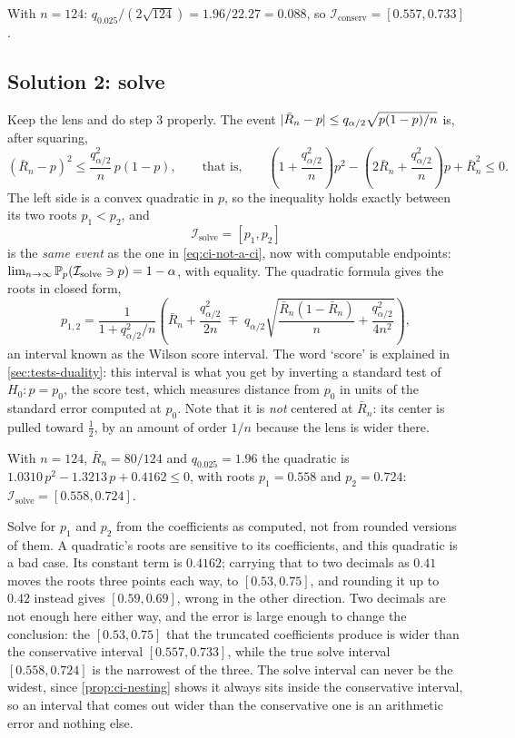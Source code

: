 With $n = 124$: $q_{0.025}/(2\sqrt{124}) = 1.96/22.27 = 0.088$, so $\mathcal{I}_{\text{conserv}} = [0.557, 0.733]$.

\subsection*{Solution 2: solve}

Keep the lens and do step 3 properly.
The event $\lvert\bar{R}_n - p\rvert \leq q_{\alpha/2}\sqrt{p(1-p)/n}$ is, after squaring,
\[
(\bar{R}_n - p)^2 \leq \frac{q_{\alpha/2}^2}{n} \, p(1-p),
\qquad \text{that is,} \qquad
\left( 1 + \frac{q_{\alpha/2}^2}{n} \right) p^2 - \left( 2\bar{R}_n + \frac{q_{\alpha/2}^2}{n} \right) p + \bar{R}_n^2 \leq 0.
\]
The left side is a convex quadratic in $p$, so the inequality holds exactly between its two roots $p_1 < p_2$, and
\[
\mathcal{I}_{\text{solve}} = [p_1, p_2]
\]
is the \textit{same event} as the one in \cref{eq:ci-not-a-ci}, now with computable endpoints: $\lim_{n \to \infty} \mathbb{P}_p(\mathcal{I}_{\text{solve}} \ni p) = 1 - \alpha$, with equality.
The quadratic formula gives the roots in closed form,
\begin{equation}
\label{eq:wilson}
p_{1,2} = \frac{1}{1 + q_{\alpha/2}^2/n} \left( \bar{R}_n + \frac{q_{\alpha/2}^2}{2n} \; \mp \; q_{\alpha/2} \sqrt{ \frac{\bar{R}_n(1 - \bar{R}_n)}{n} + \frac{q_{\alpha/2}^2}{4n^2} } \right),
\end{equation}
an interval known as the Wilson score interval.
The word `score' is explained in \cref{sec:tests-duality}: this interval is what you get by inverting a standard test of $H_0: p = p_0$, the score test, which measures distance from $p_0$ in units of the standard error computed at $p_0$.
Note that it is \textit{not} centered at $\bar{R}_n$: its center is pulled toward $\frac12$, by an amount of order $1/n$ because the lens is wider there.

With $n = 124$, $\bar{R}_n = 80/124$ and $q_{0.025} = 1.96$ the quadratic is $1.0310\,p^2 - 1.3213\,p + 0.4162 \leq 0$, with roots $p_1 = 0.558$ and $p_2 = 0.724$: $\mathcal{I}_{\text{solve}} = [0.558, 0.724]$.

\begin{pitfall}
Solve for $p_1$ and $p_2$ from the coefficients as computed, not from rounded versions of them.
A quadratic's roots are sensitive to its coefficients, and this quadratic is a bad case.
Its constant term is $0.4162$; carrying that to two decimals as $0.41$ moves the roots three points each way, to $[0.53, 0.75]$, and rounding it up to $0.42$ instead gives $[0.59, 0.69]$, wrong in the other direction.
Two decimals are not enough here either way, and the error is large enough to change the conclusion: the $[0.53, 0.75]$ that the truncated coefficients produce is wider than the conservative interval $[0.557, 0.733]$, while the true solve interval $[0.558, 0.724]$ is the narrowest of the three.
The solve interval can never be the widest, since \cref{prop:ci-nesting} shows it always sits inside the conservative interval, so an interval that comes out wider than the conservative one is an arithmetic error and nothing else.
\end{pitfall}

